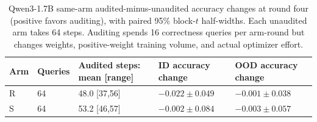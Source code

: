 \begin{table}[H]
\caption{Qwen3-1.7B same-arm audited-minus-unaudited accuracy changes at round four (positive favors auditing), with paired 95\% block-$t$ half-widths. Each unaudited arm takes 64 steps. Auditing spends 16 correctness queries per arm-round but changes weights, positive-weight training volume, and actual optimizer effort.}
\label{tab:qwen-audit-change}
\centering\small\setlength{\tabcolsep}{3pt}
\begin{tabular}{@{}lllll@{}}
\toprule
Arm & Queries & Audited steps: mean [range] & ID accuracy change & OOD accuracy change\\
\midrule
R & 64 & 48.0 [37,56] & $-0.022\pm0.049$ & $-0.001\pm0.038$\\
S & 64 & 53.2 [46,57] & $-0.002\pm0.084$ & $-0.003\pm0.057$\\
\bottomrule
\end{tabular}
\end{table}
